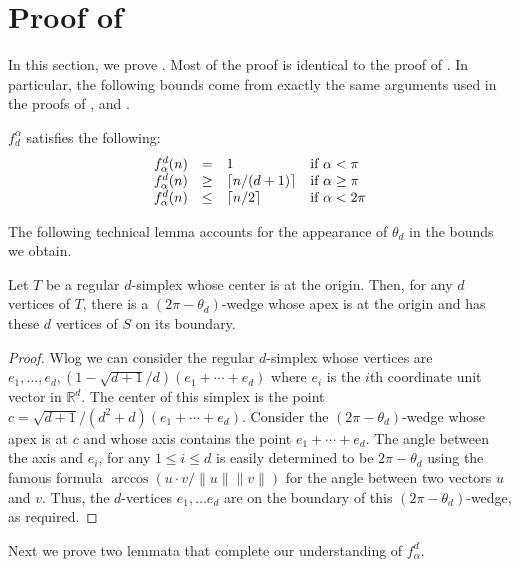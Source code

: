 \documentclass[lotsofwhite]{patmorin}
\begin{document}
\section{Proof of }

In this section, we prove .  Most of the proof is
identical to the proof of .  In particular, the
following bounds come from exactly the same arguments used in the
proofs of ,  and .

\begin{lem}
$f^\alpha_d$ satisfies the following:
\[\begin{array}{lcll}
  f^d_\alpha(n) & = & 1 & \mbox{if $\alpha < \pi$} \\
  f^d_\alpha(n) & \ge & \left\lceil n/(d+1) \right\rceil & \mbox{if $\alpha \ge \pi$} \\
  f^d_\alpha(n) & \le & \left\lceil n/2 \right\rceil & \mbox{if $\alpha < 2\pi$} \\
\end{array}\]
\end{lem}

The following technical lemma accounts for the appearance of $\theta_d$
in the bounds we obtain.

\begin{lem}
Let $T$ be a regular $d$-simplex whose center is at the origin.  Then,
for any $d$ vertices of $T$, there is a $(2\pi-\theta_d)$-wedge whose apex is
at the origin and has these $d$ vertices of $S$ on its boundary.
\end{lem}

\begin{proof} 
Wlog we can consider the regular $d$-simplex whose vertices are
$e_1,\ldots,e_d, (1-\sqrt{d+1}/d)(e_1+\cdots+e_d)$ where $e_i$ is the
$i$th coordinate unit vector in $\mathbb{R}^d$.  The center of this
simplex is the point $c=\sqrt{d+1}/(d^2+d)(e_1+\cdots+ e_d)$.
Consider the $(2\pi-\theta_d)$-wedge whose apex is at $c$ and whose axis
contains the point $e_1+\cdots+e_d$.  The angle between the axis and
$e_i$, for any $1\le i\le d$ is easily determined to be
$2\pi-\theta_d$ using the famous formula $\arccos (u\cdot
v/\|u\|\|v\|)$ for the angle between two vectors $u$ and $v$.   Thus,
the $d$-vertices $e_1,\ldots e_d$ are on the boundary of this
$(2\pi-\theta_d)$-wedge, as required.  
\end{proof}

Next we prove two lemmata that complete our understanding of $f_\alpha^d$.
\end{document}
